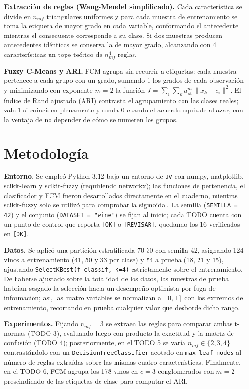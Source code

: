 \documentclass[11pt,letterpaper]{article}
\begin{document}
\textbf{Extracción de reglas (Wang-Mendel simplificado).} Cada característica se divide en $n_{mf}$ triangulares uniformes y para cada muestra de entrenamiento se toma la etiqueta de mayor grado en cada variable, conformando el antecedente mientras el consecuente corresponde a su clase. Si dos muestras producen antecedentes idénticos se conserva la de mayor grado, alcanzando con 4 características un tope teórico de $n_{mf}^4$ reglas.

\textbf{Fuzzy C-Means y ARI.} FCM agrupa sin recurrir a etiquetas: cada muestra pertenece a cada grupo con un grado, sumando 1 los grados de cada observación y minimizando con exponente $m=2$ la función $J=\sum_i\sum_k u_{ik}^m\,\lVert x_k-c_i\rVert^2$. El índice de Rand ajustado (ARI) contrasta el agrupamiento con las clases reales; vale 1 si coinciden plenamente y ronda 0 cuando el acuerdo equivale al azar, con la ventaja de no depender de cómo se numeren los grupos.

\section{Metodología}

\textbf{Entorno.} Se empleó Python 3.12 bajo un entorno de \texttt{uv} con numpy, matplotlib, scikit-learn y scikit-fuzzy (requiriendo networkx); las funciones de pertenencia, el clasificador y FCM fueron desarrollados directamente en el cuaderno, mientras scikit-fuzzy solo se utilizó para comprobar la sigmoidal. La semilla (\texttt{SEMILLA = 42}) y el conjunto (\texttt{DATASET = "wine"}) se fijan al inicio; cada TODO cuenta con un punto de control que reporta \texttt{[OK]} o \texttt{[REVISAR]}, quedando los 16 verificados en \texttt{[OK]}.

\textbf{Datos.} Se aplicó una partición estratificada 70-30 con semilla 42, asignando 124 vinos a entrenamiento (41, 50 y 33 por clase) y 54 a prueba (18, 21 y 15), ajustando \texttt{SelectKBest(f\_classif, k=4)} estrictamente sobre el entrenamiento. De haberse ajustado sobre la totalidad de los datos, las muestras de prueba habrían sesgado la selección hacia un desempeño optimista por fuga de información; así, las cuatro variables se normalizan a $[0,1]$ con los extremos del entrenamiento, recortando en prueba cualquier valor que desborde dicho rango.

\textbf{Experimentos.} Fijando $n_{mf}=3$ se extraen las reglas para comparar ambas t-normas (TODO 3), evaluando luego con producto la exactitud y la matriz de confusión (TODO 4); posteriormente, en el TODO 5 se varía $n_{mf}\in\{2,3,4\}$ contrastándolo con un \texttt{DecisionTreeClassifier} acotado en \texttt{max\_leaf\_nodes} al número de reglas extraídas sobre las mismas cuatro características. Finalmente, en el TODO 6, FCM agrupa los 178 vinos en $c=3$ conglomerados con $m=2$ prescindiendo de las etiquetas de clase para computar el ARI.
\end{document}
